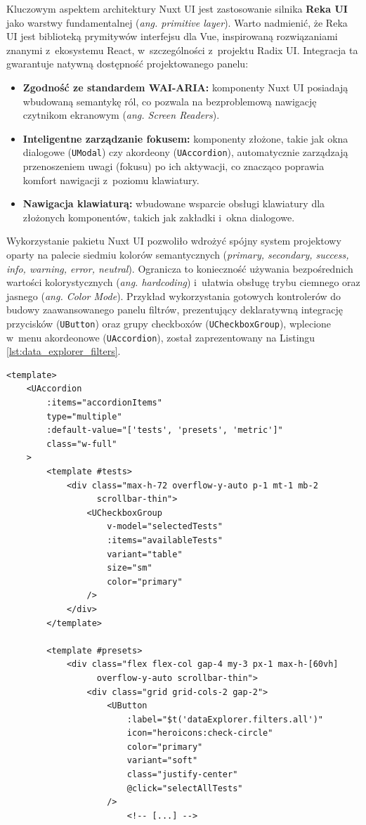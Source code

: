 Kluczowym aspektem architektury Nuxt UI jest zastosowanie silnika \textbf{Reka UI} jako warstwy fundamentalnej (\textit{ang. primitive layer}).
Warto nadmienić, że Reka UI jest biblioteką prymitywów interfejsu dla Vue, inspirowaną rozwiązaniami znanymi z~ekosystemu React, w~szczególności z~projektu Radix UI.
Integracja ta gwarantuje natywną dostępność projektowanego panelu:
\begin{itemize}
	\item \textbf{Zgodność ze standardem WAI-ARIA:}
	      komponenty Nuxt UI posiadają wbudowaną semantykę ról, co pozwala na bezproblemową nawigację czytnikom ekranowym (\textit{ang. Screen Readers}).
	\item \textbf{Inteligentne zarządzanie fokusem:}
	      komponenty złożone, takie jak okna dialogowe (\texttt{UModal}) czy akordeony (\texttt{UAccordion}), automatycznie zarządzają przenoszeniem uwagi (fokusu) po ich aktywacji, co znacząco poprawia komfort nawigacji z~poziomu klawiatury.
	\item \textbf{Nawigacja klawiaturą:}
	      wbudowane wsparcie obsługi klawiatury dla złożonych komponentów, takich jak zakładki i~okna dialogowe.
\end{itemize}

Wykorzystanie pakietu Nuxt UI pozwoliło wdrożyć spójny system projektowy oparty na palecie siedmiu kolorów semantycznych (\textit{primary, secondary, success, info, warning, error, neutral}).
Ogranicza to konieczność używania bezpośrednich wartości kolorystycznych (\textit{ang. hardcoding}) i~ułatwia obsługę trybu ciemnego oraz jasnego (\textit{ang. Color Mode}).
Przykład wykorzystania gotowych kontrolerów do budowy zaawansowanego panelu filtrów, prezentujący deklaratywną integrację przycisków (\texttt{UButton}) oraz grupy checkboxów (\texttt{UCheckboxGroup}), wplecione w~menu akordeonowe (\texttt{UAccordion}), został zaprezentowany na Listingu \ref{lst:data_explorer_filters}.

\begin{listing}[htbp]
	\caption{Deklaratywna budowa interfejsu sterującego z~użyciem zoptymalizowanych komponentów Nuxt UI (\texttt{DataExplorerFilters.vue}) \cite{espy_nexus_nuxt_dashboard}.}
	\label{lst:data_explorer_filters}
	\begin{verbatim}
<template>
	<UAccordion
		:items="accordionItems"
		type="multiple"
		:default-value="['tests', 'presets', 'metric']"
		class="w-full"
	>
		<template #tests>
			<div class="max-h-72 overflow-y-auto p-1 mt-1 mb-2
                  scrollbar-thin">
				<UCheckboxGroup
					v-model="selectedTests"
					:items="availableTests"
					variant="table"
					size="sm"
					color="primary"
				/>
			</div>
		</template>

		<template #presets>
			<div class="flex flex-col gap-4 my-3 px-1 max-h-[60vh]
                  overflow-y-auto scrollbar-thin">
				<div class="grid grid-cols-2 gap-2">
					<UButton
						:label="$t('dataExplorer.filters.all')"
						icon="heroicons:check-circle"
						color="primary"
						variant="soft"
						class="justify-center"
						@click="selectAllTests"
					/>
                        <!-- [...] -->
\end{verbatim}
\end{listing}


